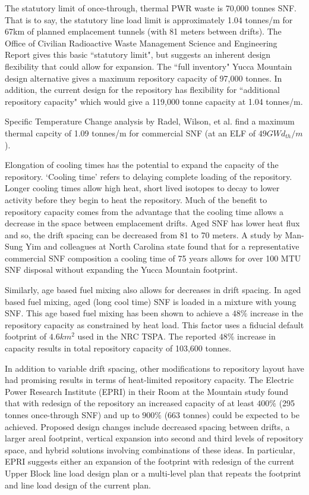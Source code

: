 The statutory limit of once-through, thermal PWR waste is 70,000 
tonnes SNF. That is to say, the statutory line load limit is 
approximately 1.04 tonnes/m for 67km of planned emplacement tunnels 
(with 81 meters between drifts). The Office of Civilian Radioactive 
Waste Management Science and Engineering Report gives this basic 
``statutory limit", but suggests an inherent design flexibility that 
could allow for expansion. The ``full inventory" Yucca Mountain design 
alternative gives a maximum repository capacity of 97,000 tonnes. In 
addition, the current design for the repository has flexibility for 
``additional repository capacity" which would give a 119,000 tonne 
capacity at 1.04 tonnes/m.\cite{OCRWMSciEng} 

Specific Temperature Change analysis by Radel, Wilson, et al. find a 
maximum thermal capcity of 1.09 tonnes/m for commercial SNF (at an ELF 
of $49 GWd_{th}/m$).\cite{radel_effect_2007} 

Elongation of cooling times has the potential to expand the capacity 
of the repository. `Cooling time' refers to delaying complete loading 
of the repository. Longer cooling times allow high heat, short lived 
isotopes to decay to lower activity before they begin to heat the 
repository. Much of the benefit to repository capacity comes from the 
advantage that the cooling time allows a decrease in the space between 
emplacement drifts. Aged SNF has lower heat flux and so, the drift 
spacing can be decreased from 81 to 70 meters. A study by Man-Sung Yim 
and colleagues at North Carolina state found that for a representative 
commercial SNF composition a cooling time of 75 years allows for over 
100 MTU SNF disposal without expanding the Yucca Mountain 
footprint.\cite{li_examining_2007}

Similarly, age based fuel mixing also allows for decreases in drift 
spacing. In aged based fuel mixing, aged (long cool time) SNF is 
loaded in a mixture with young SNF. This age based fuel mixing has 
been shown to achieve a $48\%$ increase in the repository capacity as 
constrained by heat load.\cite{nicholson_thermal_2007} This factor 
uses a fiducial default footprint of $4.6 km^2$ used in the NRC TSPA. 
The reported $48\%$ increase in capacity results in total repository 
capacity of 103,600 tonnes.\cite{williams_contract_2001}

In addition to variable drift spacing, other modifications to 
repository layout have had promising results in terms of heat-limited 
repository capacity. The Electric Power Research Institute (EPRI) in 
their Room at the Mountain study found that with redesign of the 
repository an increased capacity of at least $400\%$ (295 tonnes 
once-through SNF) and up to $900\%$ (663 tonnes) could be expected to 
be achieved. Proposed design changes include decreased spacing between 
drifts, a larger areal footprint, vertical expansion into second and 
third levels of repository space, and hybrid solutions involving 
combinations of these ideas. In particular, EPRI suggests either an 
expansion of the footprint with redesign of the current Upper Block 
line load design plan or a multi-level plan that repeats the footprint 
and line load design of the current plan.\cite{kessler_room_2006}


